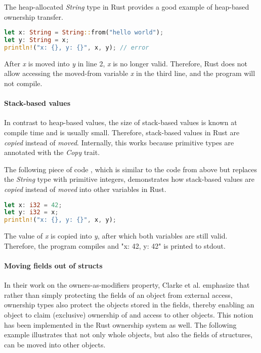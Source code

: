 \documentclass[sigplan,11pt,nonacm]{acmart}
\begin{document}
The heap-allocated \emph{String} type in Rust provides a good example of heap-based ownership transfer.
\begin{lstlisting}[language=Rust,captionpos=b,caption={Rust String move}]
let x: String = String::from("hello world");
let y: String = x;
println!("x: {}, y: {}", x, y); // error
\end{lstlisting}
After \emph{x} is moved into \emph{y} in line 2, \emph{x} is no longer valid.
Therefore, Rust does not allow accessing the moved-from variable \emph{x} in the third line, and the program will not compile.


\paragraph{Stack-based values}

In contrast to heap-based values, the size of stack-based values is known at compile time and is usually small.
Therefore, stack-based values in Rust are \emph{copied} instead of \emph{moved}.
Internally, this works because primitive types are annotated with the \emph{Copy} trait.

The following piece of code \cite{rust-book}, which is similar to the code from above but replaces the \emph{String} type with primitive integers, demonstrates how stack-based values are \emph{copied} instead of \emph{moved} into other variables in Rust.
\begin{lstlisting}[language=Rust,captionpos=b,caption={Rust stack-based move}]
let x: i32 = 42;
let y: i32 = x;
println!("x: {}, y: {}", x, y);
\end{lstlisting}
The value of \emph{x} is copied into \emph{y}, after which both variables are still valid.
Therefore, the program compiles and "x: 42, y: 42" is printed to stdout.


\paragraph{Moving fields out of structs}

In their work on the owners-as-modifiers property, Clarke et al. \cite{ownership-types-survey} emphasize that rather than simply protecting the fields of an object from external access, ownership types also protect the objects stored in the fields, thereby enabling an object to claim (exclusive) ownership of and access to other objects.
This notion has been implemented in the Rust ownership system as well.
The following example illustrates that not only whole objects, but also the fields of structures, can be moved into other objects.
\end{document}
